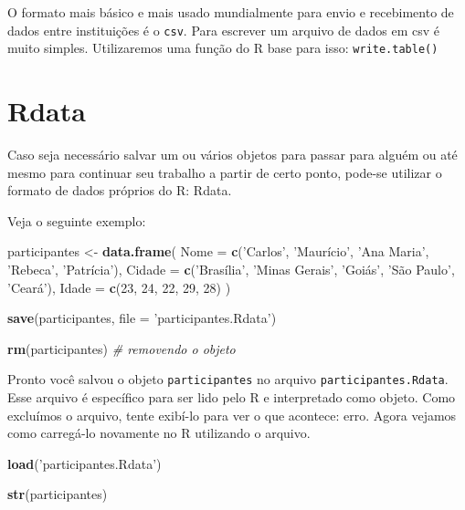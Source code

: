 \documentclass[]{book}
\newenvironment{Shaded}{\begin{snugshade}}{\end{snugshade}}
\newcommand{\KeywordTok}[1]{\textcolor[rgb]{0.13,0.29,0.53}{\textbf{#1}}}
\newcommand{\DataTypeTok}[1]{\textcolor[rgb]{0.13,0.29,0.53}{#1}}
\newcommand{\DecValTok}[1]{\textcolor[rgb]{0.00,0.00,0.81}{#1}}
\newcommand{\StringTok}[1]{\textcolor[rgb]{0.31,0.60,0.02}{#1}}
\newcommand{\CommentTok}[1]{\textcolor[rgb]{0.56,0.35,0.01}{\textit{#1}}}
\newcommand{\NormalTok}[1]{#1}
\begin{document}
O formato mais básico e mais usado mundialmente para envio e recebimento
de dados entre instituições é o \texttt{csv}. Para escrever um arquivo
de dados em csv é muito simples. Utilizaremos uma função do R base para
isso: \texttt{write.table()}

\section{Rdata}\label{rdata}

Caso seja necessário salvar um ou vários objetos para passar para alguém
ou até mesmo para continuar seu trabalho a partir de certo ponto,
pode-se utilizar o formato de dados próprios do R: Rdata.

Veja o seguinte exemplo:

\begin{Shaded}
\begin{Highlighting}[]
\NormalTok{participantes <-}\StringTok{ }\KeywordTok{data.frame}\NormalTok{(}
  \DataTypeTok{Nome =} \KeywordTok{c}\NormalTok{(}\StringTok{'Carlos'}\NormalTok{, }\StringTok{'Maurício'}\NormalTok{, }\StringTok{'Ana Maria'}\NormalTok{, }\StringTok{'Rebeca'}\NormalTok{, }\StringTok{'Patrícia'}\NormalTok{),}
  \DataTypeTok{Cidade =} \KeywordTok{c}\NormalTok{(}\StringTok{'Brasília'}\NormalTok{, }\StringTok{'Minas Gerais'}\NormalTok{, }\StringTok{'Goiás'}\NormalTok{, }\StringTok{'São Paulo'}\NormalTok{, }\StringTok{'Ceará'}\NormalTok{),}
  \DataTypeTok{Idade =} \KeywordTok{c}\NormalTok{(}\DecValTok{23}\NormalTok{, }\DecValTok{24}\NormalTok{, }\DecValTok{22}\NormalTok{, }\DecValTok{29}\NormalTok{, }\DecValTok{28}\NormalTok{)}
\NormalTok{)}

\KeywordTok{save}\NormalTok{(participantes, }\DataTypeTok{file =} \StringTok{'participantes.Rdata'}\NormalTok{)}

\KeywordTok{rm}\NormalTok{(participantes) }\CommentTok{# removendo o objeto}
\end{Highlighting}
\end{Shaded}

Pronto você salvou o objeto \texttt{participantes} no arquivo
\texttt{participantes.Rdata}. Esse arquivo é específico para ser lido
pelo R e interpretado como objeto. Como excluímos o arquivo, tente
exibí-lo para ver o que acontece: erro. Agora vejamos como carregá-lo
novamente no R utilizando o arquivo.

\begin{Shaded}
\begin{Highlighting}[]
\KeywordTok{load}\NormalTok{(}\StringTok{'participantes.Rdata'}\NormalTok{)}

\KeywordTok{str}\NormalTok{(participantes)}
\end{Highlighting}
\end{Shaded}
\end{document}
